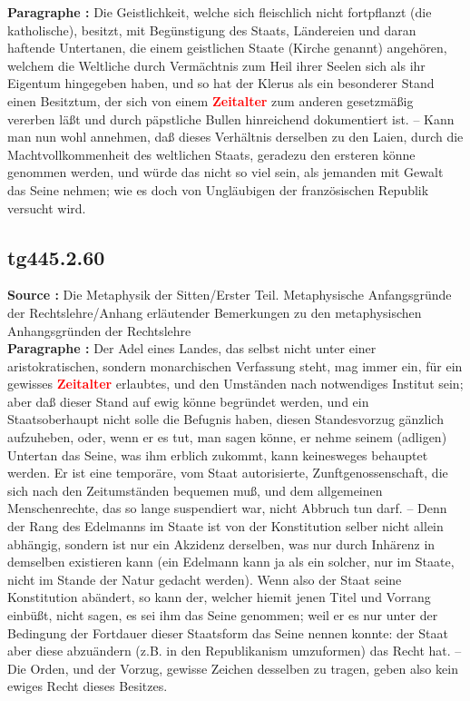 \documentclass[a4paper,12pt,twoside]{book}
\newcommand{\match}[1]{\textcolor{red}{\textbf{#1}}}
\begin{document}
	\textbf{Paragraphe : }Die Geistlichkeit, welche sich fleischlich nicht fortpflanzt (die katholische), besitzt, mit Begünstigung des Staats, Ländereien und daran haftende Untertanen, die einem geistlichen Staate (Kirche genannt) angehören, welchem die Weltliche durch Vermächtnis zum Heil ihrer Seelen sich als ihr Eigentum hingegeben haben, und so hat der Klerus als ein besonderer Stand einen Besitztum, der sich von einem \match{Zeitalter} zum anderen gesetzmäßig vererben läßt und durch päpstliche Bullen hinreichend dokumentiert ist. – Kann man nun wohl annehmen, daß dieses Verhältnis derselben zu den Laien, durch die Machtvollkommenheit des weltlichen Staats, geradezu den ersteren könne genommen werden, und würde das nicht so viel sein, als jemanden mit Gewalt das Seine nehmen; wie es doch von Ungläubigen der französischen Republik versucht wird. 
	
	\subsection*{tg445.2.60} 
	\textbf{Source : }Die Metaphysik der Sitten/Erster Teil. Metaphysische Anfangsgründe der Rechtslehre/Anhang erläutender Bemerkungen zu den metaphysischen Anhangsgründen der Rechtslehre\\  
	
	\textbf{Paragraphe : }Der Adel eines Landes, das selbst nicht unter einer aristokratischen, sondern monarchischen Verfassung steht, mag immer ein, für ein gewisses \match{Zeitalter} erlaubtes, und den Umständen nach notwendiges Institut sein; aber daß dieser Stand auf ewig könne begründet werden, und ein Staatsoberhaupt nicht solle die Befugnis haben, diesen Standesvorzug gänzlich aufzuheben, oder, wenn er es tut, man sagen könne, er nehme seinem (adligen) Untertan das Seine, was ihm erblich zukommt, kann keinesweges behauptet werden. Er ist eine temporäre, vom Staat autorisierte, Zunftgenossenschaft, die sich nach den Zeitumständen bequemen muß, und dem allgemeinen Menschenrechte, das so lange suspendiert war, nicht Abbruch tun darf. – Denn der Rang des Edelmanns im Staate ist von der Konstitution selber nicht allein abhängig, sondern ist nur ein Akzidenz derselben, was nur durch Inhärenz in demselben existieren kann (ein Edelmann kann ja als ein solcher, nur im Staate, nicht im Stande der Natur gedacht werden). Wenn also der Staat seine Konstitution abändert, so kann der, welcher  hiemit jenen Titel und Vorrang einbüßt, nicht sagen, es sei ihm das Seine genommen; weil er es nur unter der Bedingung der Fortdauer dieser Staatsform das Seine nennen konnte: der Staat aber diese abzuändern (z.B. in den Republikanism umzuformen) das Recht hat. – Die Orden, und der Vorzug, gewisse Zeichen desselben zu tragen, geben also kein ewiges Recht dieses Besitzes. 
	
\end{document}
